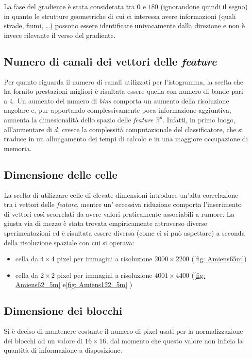 La fase del gradiente è stata considerata tra $0$ e $180$ (ignorandone quindi il segno) in quanto le strutture geometriche di cui ci interessa avere informazioni (quali strade, fiumi, \ldots) possono essere identificate univocamente dalla direzione e non è invece rilevante il verso del gradiente.

\subsection{Numero di canali dei vettori delle \emph{feature}}
Per quanto riguarda il numero di canali utilizzati per l'istogramma, la scelta che ha fornito prestazioni migliori è risultata essere quella con numero di bande pari a 4. Un aumento del numero di \emph{bins} comporta un aumento della risoluzione angolare e, pur apportando complessivamente poca informazione aggiuntiva,  aumenta la dimesionalità dello spazio delle \emph{feature} $\mathbb{R}^d$. Infatti, in primo luogo, all'aumentare di $d$, cresce la complessità computazionale del classificatore, che si traduce in un allungamento dei tempi di calcolo e in una maggiore occupazione di memoria.

\subsection{Dimensione delle celle}
La scelta di utilizzare celle di elevate dimensioni introduce un'alta correlazione tra i vettori delle \emph{feature}, mentre un' eccessiva riduzione comporta l'inserimento di vettori così scorrelati da avere valori praticamente associabili a rumore. La giusta via di mezzo è stata trovata empiricamente attraverso diverse sperimentazioni ed è risultata essere diversa (come ci si può aspettare) a seconda della risoluzione spaziale con cui si operava:
\begin{itemize}
\item cella da $4\times 4$ pixel per immagini a risoluzione $2000 \times 2200$ (\ref{fig: Amiens65m})
\item cella da $2 \times 2$ pixel per immagini a risoluzione $4001 \times 4400$ (\ref{fig: Amiens62_5m} e\ref{fig: Amiens122_5m} )
\end{itemize}

\subsection{Dimensione dei blocchi}
Si è deciso di mantenere costante il numero di pixel usati per la normalizzazione dei blocchi ad un valore di $16\times16$, dal momento che questo valore non inficia la quantità di informazione a disposizione.

